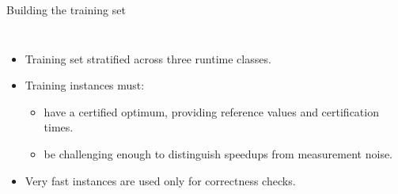\documentclass[10pt,aspectratio=169]{beamer}
\begin{document}
\begin{frame}{Building the training set}
\begin{columns}[c,onlytextwidth]

\begin{itemize}
    \item Training set stratified across \alert{three runtime classes}.
    
    \item Training instances must:
    \begin{itemize}
        \item have a \alert{certified optimum}, providing reference values and certification times.
        \item be \alert{challenging enough} to distinguish speedups from measurement noise.
    \end{itemize}

    \item Very fast instances are used only for correctness checks.
\end{itemize}

\centering
{}
\end{columns}
\end{frame}
\end{document}
